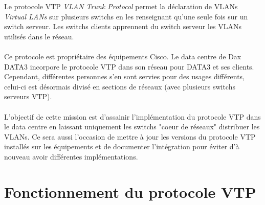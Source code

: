 \renewcommand{\figurename}{}

Le protocole VTP \textit{VLAN Trunk Protocol} permet la déclaration de VLANs \textit{Virtual LANs} sur plusieurs switchs en les renseignant qu'une seule fois sur un switch serveur. Les switchs clients apprennent du switch serveur les VLANs utilisés dans le réseau.
\\ \\
Ce protocole est propriétaire des équipements Cisco. Le data centre de Dax DATA3 incorpore le protocole VTP dans son réseau pour DATA3 et ses clients. Cependant, différentes personnes s'en sont servies pour des usages différents, celui-ci est désormais divisé en sections de réseaux (avec plusieurs switchs serveurs VTP).
\\ \\
L'objectif de cette mission est d'assainir l'implémentation du protocole VTP dans le data centre en laissant uniquement les switchs "coeur de réseaux" distribuer les VLANs. Ce sera aussi l'occasion de mettre à jour les versions du protocole VTP installés sur les équipements et de documenter l'intégration pour éviter d'à nouveau avoir différentes implémentations.

\section{Fonctionnement du protocole VTP}

